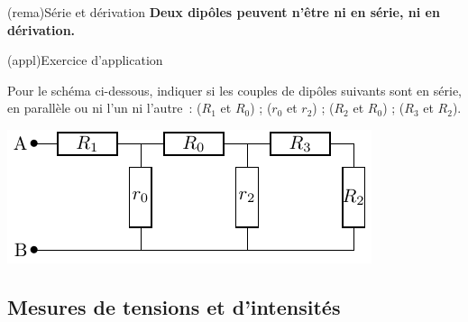 \documentclass[../../main/main.tex]{subfiles}
\begin{document}
\begin{tcb}[label=rema:serdiv, halign=center](rema){Série et dérivation}
	\textbf{Deux dipôles peuvent n'être ni en série, ni en dérivation.}
\end{tcb}
\begin{tcb}[label=exer:serdiv](appl){Exercice d'application}
	\begin{minipage}{0.65\linewidth}
		Pour le schéma ci-dessous, indiquer si les couples de dipôles suivants
		sont en série, en parallèle ou ni l'un ni l'autre~: ($R_1$ et $R_0$) ;
		($r_0$ et $r_2$) ; ($R_2$ et $R_0$) ; ($R_3$ et $R_2$).
	\end{minipage}
	\begin{minipage}{0.35\linewidth}
		\begin{center}
			\includegraphics[width=\linewidth]{exer_serdiv}
		\end{center}
	\end{minipage}
	\tcblower
\end{tcb}

\subsection{Mesures de tensions et d'intensités}
\end{document}

